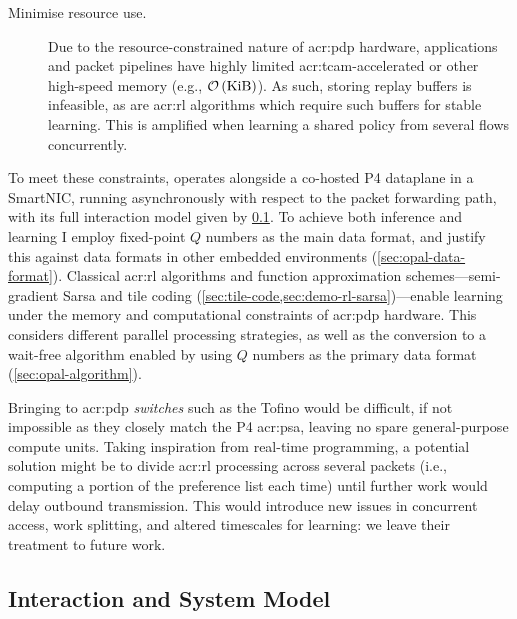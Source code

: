 \begin{description}
	\item[Minimise resource use.] Due to the resource-constrained nature of \gls{acr:pdp} hardware, applications and packet pipelines have highly limited \gls{acr:tcam}-accelerated or other high-speed memory (e.g., $\mathcal{O}\left(\unit{\kibi\byte}\right)$). As such, storing replay buffers is infeasible, as are \gls{acr:rl} algorithms which require such buffers for stable learning. This is amplified when learning a shared policy from several flows concurrently.
	
%	
\end{description}

To meet these constraints, \approachshort{} operates alongside a co-hosted P4 dataplane in a SmartNIC, running asynchronously with respect to the packet forwarding path, with its full interaction model given by \cref{sec:opal-sys-model}.
To achieve both inference and learning I employ fixed-point $Q$ numbers as the main data format, and justify this against data formats in other embedded environments (\cref{sec:opal-data-format}).
Classical \gls{acr:rl} algorithms and function approximation schemes---semi-gradient Sarsa and tile coding (\cref{sec:tile-code,sec:demo-rl-sarsa})---enable learning under the memory and computational constraints of \gls{acr:pdp} hardware. This considers different parallel processing strategies, as well as the conversion to a wait-free algorithm enabled by using $Q$ numbers as the primary data format (\cref{sec:opal-algorithm}).

Bringing \approachshort{} to \gls{acr:pdp} \emph{switches} such as the Tofino would be difficult, if not impossible as they closely match the P4 \gls{acr:psa}, leaving no spare general-purpose compute units.
Taking inspiration from real-time programming, a potential solution might be to divide \gls{acr:rl} processing across several packets (i.e., computing a portion of the preference list each time) until further work would delay outbound transmission.
This would introduce new issues in concurrent access, work splitting, and altered timescales for learning: we leave their treatment to future work.

\subsection{Interaction and System Model}\label{sec:opal-sys-model}

